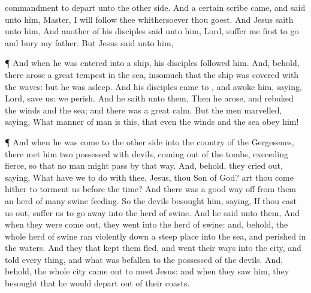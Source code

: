 {commandment to
depart
unto the other
side.
And a
certain
scribe
came, and
said unto
him,
Master, I will
follow
thee
whithersoever thou
goest.
And
Jesus
saith unto
him,
{}
And
another
of
his
disciples
said unto
him,
Lord,
suffer
me
first to
go
and
bury
my
father.
But
Jesus
said unto
him,
{}
\par }{\PP {}¶
And
when
he was
entered
into a
ship,
his
disciples
followed
him.
And,
behold, there
arose a
great
tempest
in the
sea, insomuch
that the
ship was
covered
with the
waves:
but
he was
asleep.
And
his
disciples came
to
{}, and
awoke
him,
saying,
Lord,
save
us: we
perish.
And he
saith unto
them,
{}
Then he
arose, and
rebuked the
winds
and the
sea;
and there
was a
great
calm.
But the
men
marvelled,
saying, What manner of
man
is
this,
that
even the
winds
and the
sea
obey
him!
\par }{\PP {}¶
And
when
he was
come
to the other
side
into the
country of the
Gergesenes, there
met
him
two possessed with
devils, coming
out
of the
tombs,
exceeding
fierce, so
that
no
man
might
pass
by
that
way.
And,
behold, they cried
out,
saying,
What have
we to
do with
thee,
Jesus, thou
Son of
God? art thou
come
hither to
torment
us
before the
time?
And there
was a good way
off
from
them an
herd of
many
swine
feeding.
So the
devils
besought
him,
saying,
If thou
cast
us
out,
suffer
us to go
away
into the
herd of
swine.
And he
said unto
them,
{}
And when they were come
out, they
went
into the
herd of
swine:
and,
behold, the
whole
herd of
swine ran
violently
down a steep
place
into the
sea,
and
perished
in the
waters.
And they that kept
them
fled,
and went their
ways
into the
city, and
told every
thing,
and what was
befallen to the possessed of the
devils.
And,
behold, the
whole
city came
out
to
meet
Jesus:
and when they
saw
him, they
besought
{}
that he would
depart
out
of
their
coasts.

}
